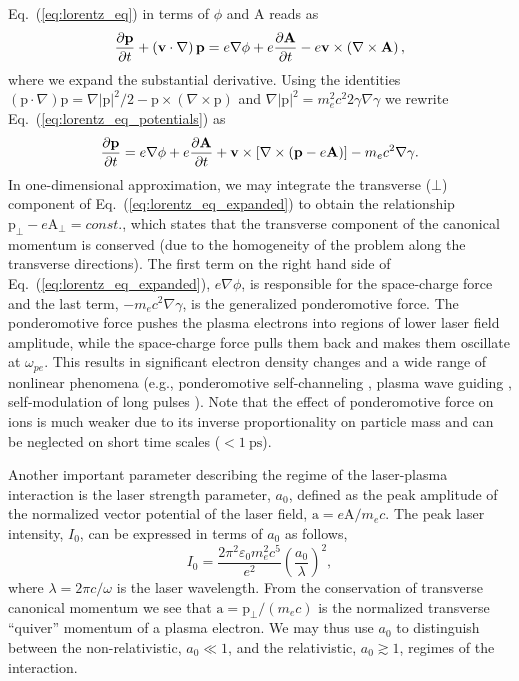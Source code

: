 \documentclass[10pt, a4paper, twoside, openright]{report}
\newcommand{\q}[1]{``#1''} %
\newcommand{\norm}[1]{|#1|}
\renewcommand{\vec}[1]{\boldsymbol{\mathrm{#1}}}
\newcommand{\rot}[1]{\nabla \times #1}
\newcommand{\grad}[1]{\nabla #1}
\begin{document}
Eq.~(\ref{eq:lorentz_eq}) in terms of $ \phi $ and $ \vec{A} $ reads as
\begin{equation}\label{eq:lorentz_eq_potentials}
	\diffp{\vec{p}}{t} + \left(\vec{v} \cdot \grad \right) \vec{p} = e \grad{\phi} + e \diffp{\vec{A}}{t} - e \vec{v} \times \left( \rot{\vec{A}} \right),
\end{equation}
where we expand the substantial derivative. Using the identities $ \left(\vec{p} \cdot \grad{} \right) \vec{p} = \grad{\norm{\vec{p}}^2} / 2 - \vec{p} \times \left( \rot{\vec{p}} \right) $ and $ \grad{\norm{\vec{p}}^2} = m_e^2 c^2 2 \gamma \grad{\gamma} $ we rewrite Eq.~(\ref{eq:lorentz_eq_potentials}) as
\begin{equation}\label{eq:lorentz_eq_expanded}
	\diffp{\vec{p}}{t} = e \grad{\phi} + e \diffp{\vec{A}}{t} + \vec{v} \times \left[ \rot{\left(\vec{p} - e \vec{A} \right)} \right] - m_e c^2 \grad{\gamma}.
\end{equation}
In one-dimensional approximation, we may integrate the transverse ($ \bot $) component of Eq.~(\ref{eq:lorentz_eq_expanded}) to obtain the relationship $ \vec{p}_{\bot} - e \vec{A}_{\bot} = const. $, which states that the transverse component of the canonical momentum is conserved (due to the homogeneity of the problem along the transverse directions). The first term on the right hand side of Eq.~(\ref{eq:lorentz_eq_expanded}), $ e \grad{\phi} $, is responsible for the space-charge force and the last term, $ - m_e c^2 \grad{\gamma} $, is the generalized ponderomotive force. The ponderomotive force pushes the plasma electrons into regions of lower laser field amplitude, while the space-charge force pulls them back and makes them oscillate at $ \omega_{pe} $. This results in significant electron density changes and a wide range of nonlinear phenomena (e.g., ponderomotive self-channeling \cite{Sun1987, Kurki-Suonio1989, Borisov1992}, plasma wave guiding \cite{Sprangle1990, Sprangle1992, Chen1993}, self-modulation of long pulses \cite{Andreev1992, Antonsen1992, Krall1993}). Note that the effect of ponderomotive force on ions is much weaker due to its inverse proportionality on particle mass and can be neglected on short time scales ($ < 1 \ \mathrm{ps} $).

Another important parameter describing the regime of the laser-plasma interaction is the laser strength parameter, $ a_0 $, defined as the peak amplitude of the normalized vector potential of the laser field, $ \vec{a} = e \vec{A} / m_e c $. The peak laser intensity, $ I_0 $, can be expressed in terms of $ a_0 $ as follows,
\begin{equation}\label{eq:laser_intensity}
	I_0 = \frac{2 \pi^2 \varepsilon_0 m_e^2 c^5}{e^2} \left( \frac{a_0}{\lambda} \right)^2,
\end{equation} 
where $ \lambda = 2 \pi c / \omega $ is the laser wavelength. From the conservation of transverse canonical momentum we see that $ \vec{a} = \vec{p}_{\bot} / \left( m_e c \right) $ is the normalized transverse \q{quiver} momentum of a plasma electron. We may thus use $ a_0 $ to distinguish between the non-relativistic, $ a_0 \ll 1 $, and the relativistic, $ a_0 \gtrsim 1 $, regimes of the interaction. %
\end{document}
